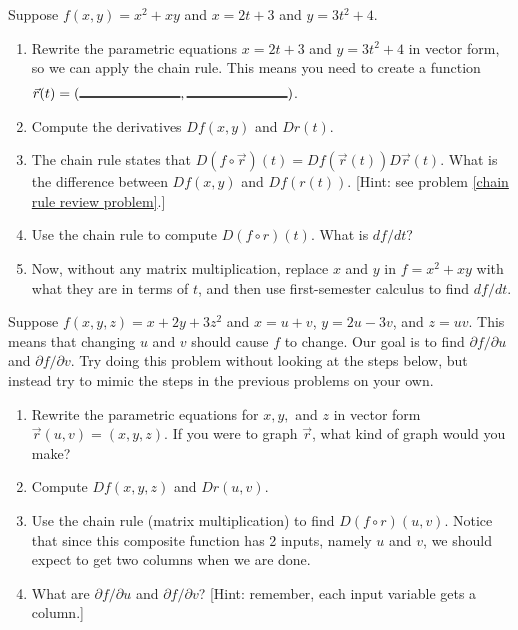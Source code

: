\begin{problem}%
 Suppose $f(x,y) = x^2+xy$ and $x=2t+3$ and $y=3t^2+4$.
 \begin{enumerate}
  \item Rewrite the parametric equations $x=2t+3$ and $y=3t^2+4$ in vector form, so we can apply the chain rule. This means you need to create a function $\vec r(t) = (\blank{1in}, \blank{1in})$.
  \item Compute the derivatives $Df(x,y)$ and $Dr(t)$. 
  \item The chain rule states that $D(f\circ \vec r)(t) = Df(\vec r(t))D\vec r(t)$. What is the difference between $Df(x,y)$ and $Df(r(t))$. [Hint: see problem \ref{chain rule review problem}.]
  \item Use the chain rule to compute $D(f\circ r)(t)$. What is $df/dt$?
  \item Now, without any matrix multiplication, replace $x$ and $y$ in $f=x^2+xy$ with what they are in terms of $t$, and then use first-semester calculus to find $df/dt$.
 \end{enumerate}
\end{problem}

\begin{problem}%
 Suppose $f(x,y,z) = x+2y+3z^2$ and $x=u+v$, $y=2u-3v$, and $z=uv$.  This means that changing $u$ and $v$ should cause $f$ to change. Our goal is to find $\partial f/\partial u$ and $\partial f/\partial v$. Try doing this problem without looking at the steps below, but instead try to mimic the steps in the previous problems on your own. 
 \begin{enumerate}
  \item Rewrite the parametric equations for $x,y,$ and $z$ in vector form $\vec r(u,v)=(x,y,z)$. If you were to graph $\vec r$, what kind of graph would you make?
  \item Compute $Df(x,y,z)$ and $Dr(u,v)$.  
  \item Use the chain rule (matrix multiplication) to find $D(f\circ r)(u,v)$.  Notice that since this composite function has 2 inputs, namely $u$ and $v$, we should expect to get two columns when we are done.
  \item What are $\partial f/\partial u$ and $\partial f/\partial v$? [Hint: remember, each input variable gets a column.]
 \end{enumerate}
\end{problem}

